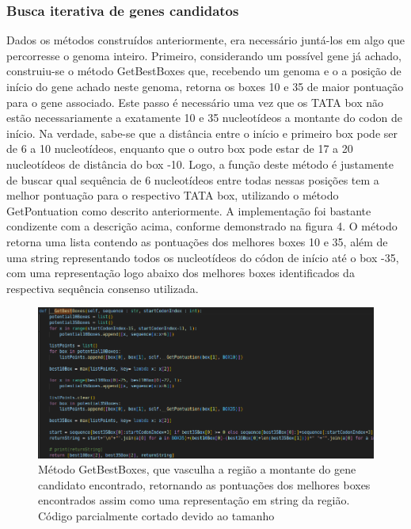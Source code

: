 \documentclass[brazilian,12pt,a4paper,final]{article}
\begin{document}
\subsubsection{Busca iterativa de genes candidatos}
Dados os métodos construídos anteriormente, era necessário juntá-los em algo que percorresse o genoma inteiro. Primeiro, considerando um possível gene já achado, construiu-se o método GetBestBoxes que, recebendo um genoma e o a posição de início do gene achado neste genoma, retorna os boxes 10 e 35 de maior pontuação para o gene associado. Este passo é necessário uma vez que os TATA box não estão necessariamente a exatamente 10 e 35 nucleotídeos a montante do codon de início. Na verdade, sabe-se que a distância entre o início e primeiro box pode ser de 6 a 10 nucleotídeos, enquanto que o outro box pode estar de 17 a 20 nucleotídeos de distância do box -10. Logo, a função deste método é justamente de buscar qual sequência de 6 nucleotídeos entre todas nessas posições tem a melhor pontuação para o respectivo TATA box, utilizando o método GetPontuation como descrito anteriormente. A implementação foi bastante condizente com a descrição acima, conforme demonstrado na figura 4. O método retorna uma lista contendo as pontuações dos melhores boxes 10 e 35, além de uma string representando todos os nucleotídeos do códon de início até o box -35, com uma representação logo abaixo dos melhores boxes identificados da respectiva sequência consenso utilizada.

\begin{figure}[hbtp]
	\begin{center}
		\includegraphics[]{../Figures/GetBestBoxes.png}
		\caption{Método GetBestBoxes, que vasculha a região a montante do gene candidato encontrado, retornando as pontuações dos melhores boxes encontrados assim como uma representação em string da região. Código parcialmente cortado devido ao tamanho}
		\label{fig}
	\end{center}
\end{figure}
	
\end{document}
